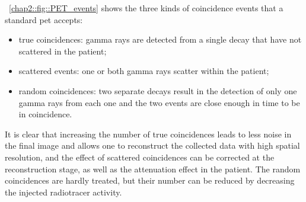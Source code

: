 \figurename~\ref{chap2::fig::PET_events} shows the three kinds of coincidence events that a standard \gls{pet} accepts: 
\begin{itemize}
\item true coincidences: gamma rays are detected from a single decay that have not scattered in the patient;
\item scattered events: one or both gamma rays scatter within the patient;
\item random coincidences: two separate decays result in the detection of only one gamma rays from each one and the two events are close enough in time to be in coincidence.
\end{itemize}
It is clear that increasing the number of true coincidences leads to less noise in the final image and allows one to reconstruct the collected data with high spatial resolution, and the effect of scattered coincidences can be corrected at the reconstruction stage, as well as the attenuation effect in the patient. The random coincidences are hardly treated, but their number can be reduced by decreasing the injected radiotracer activity.

